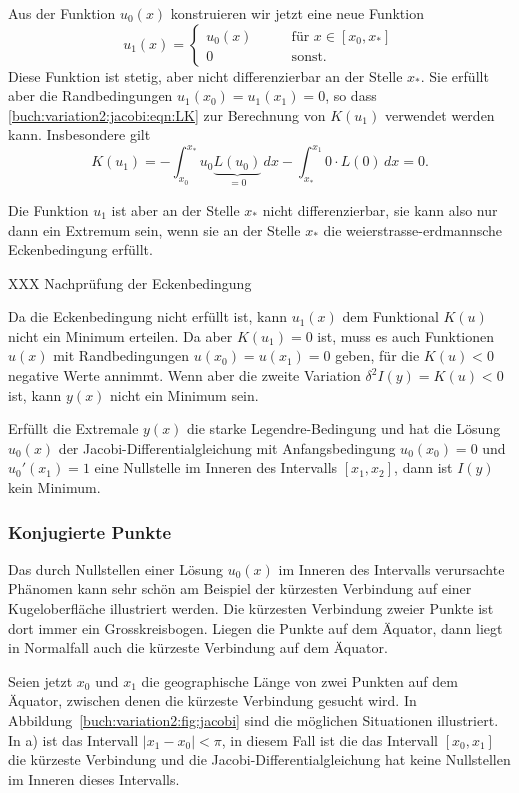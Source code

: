 Aus der Funktion $u_0(x)$ konstruieren wir jetzt eine neue Funktion
\[
u_1(x)
=
\begin{cases}
u_0(x) &\qquad \text{für $x\in [x_0,x_*]$}\\
0      &\qquad \text{sonst.}
\end{cases}
\]
Diese Funktion ist stetig, aber nicht differenzierbar an der Stelle
$x_*$.
Sie erfüllt aber die Randbedingungen $u_1(x_0)=u_1(x_1)=0$, so dass
\eqref{buch:variation2:jacobi:eqn:LK}
zur Berechnung von $K(u_1)$ verwendet werden kann.
Insbesondere gilt
\[
K(u_1)
=
-
\int_{x_0}^{x_*}
u_0
\underbrace{L(u_0)}_{\displaystyle=0}
\,dx
-
\int_{x_*}^{x_1}
0
\cdot L(0)
\,dx
=
0.
\]

Die Funktion $u_1$ ist aber an der Stelle $x_*$ nicht differenzierbar,
sie kann also nur dann ein Extremum sein, wenn sie an der Stelle
$x_*$ die weierstrasse-erdmannsche Eckenbedingung erfüllt.

XXX Nachprüfung der Eckenbedingung

Da die Eckenbedingung nicht erfüllt ist, kann $u_1(x)$ dem Funktional
$K(u)$ nicht ein Minimum erteilen.
Da aber $K(u_1)=0$ ist, muss es auch Funktionen $u(x)$ mit Randbedingungen
$u(x_0)=u(x_1)=0$ geben, für die $K(u)<0$ negative Werte annimmt.
Wenn aber die zweite Variation $\delta^2I(y)=K(u)<0$ ist, kann $y(x)$
nicht ein Minimum sein.

\begin{satz}
Erfüllt die Extremale $y(x)$ die starke Legendre-Bedingung und hat
die Lösung $u_0(x)$ der Jacobi-Differentialgleichung mit Anfangsbedingung
$u_0(x_0)=0$ und $u_0'(x_1)=1$ eine Nullstelle im Inneren des Intervalls
$[x_1,x_2]$, dann ist $I(y)$ kein Minimum.
\end{satz}

%
%
\subsubsection{Konjugierte Punkte}

Das durch Nullstellen einer Lösung $u_0(x)$ im Inneren des Intervalls
verursachte Phänomen kann sehr schön am Beispiel der kürzesten
Verbindung auf einer Kugeloberfläche illustriert werden.
Die kürzesten Verbindung zweier Punkte ist dort immer ein Grosskreisbogen.
Liegen die Punkte auf dem Äquator, dann liegt in Normalfall auch die
kürzeste Verbindung auf dem Äquator.

Seien jetzt $x_0$ und $x_1$ die geographische Länge von zwei Punkten
auf dem Äquator, zwischen denen die kürzeste Verbindung gesucht wird.
In Abbildung~\ref{buch:variation2:fig:jacobi} sind die möglichen
Situationen illustriert.
In a) ist das Intervall $|x_1-x_0|<\pi$, in diesem Fall ist die
das Intervall $[x_0,x_1]$ die kürzeste Verbindung und die 
Jacobi-Differentialgleichung hat keine Nullstellen im Inneren 
dieses Intervalls.

